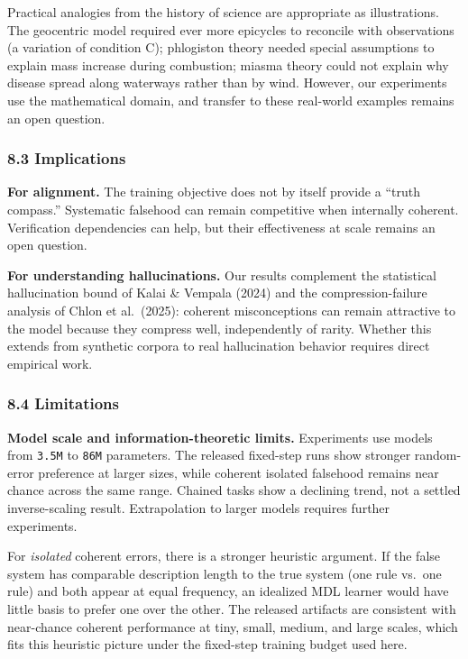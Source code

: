 \documentclass[
  11pt,
]{article}
\begin{document}
Practical analogies from the history of science are appropriate as
illustrations. The geocentric model required ever more epicycles to
reconcile with observations (a variation of condition C); phlogiston
theory needed special assumptions to explain mass increase during
combustion; miasma theory could not explain why disease spread along
waterways rather than by wind. However, our experiments use the
mathematical domain, and transfer to these real-world examples remains
an open question.

\subsubsection{8.3 Implications}\label{implications}

\textbf{For alignment.} The training objective does not by itself
provide a ``truth compass.'' Systematic falsehood can remain competitive
when internally coherent. Verification dependencies can help, but their
effectiveness at scale remains an open question.

\textbf{For understanding hallucinations.} Our results complement the
statistical hallucination bound of Kalai \& Vempala (2024) and the
compression-failure analysis of Chlon et al.~(2025): coherent
misconceptions can remain attractive to the model because they compress
well, independently of rarity. Whether this extends from synthetic
corpora to real hallucination behavior requires direct empirical work.

\subsubsection{8.4 Limitations}\label{limitations}

\textbf{Model scale and information-theoretic limits.} Experiments use
models from \texttt{3.5M} to \texttt{86M} parameters. The released
fixed-step runs show stronger random-error preference at larger sizes,
while coherent isolated falsehood remains near chance across the same
range. Chained tasks show a declining trend, not a settled
inverse-scaling result. Extrapolation to larger models requires further
experiments.

For \emph{isolated} coherent errors, there is a stronger heuristic
argument. If the false system has comparable description length to the
true system (one rule vs.~one rule) and both appear at equal frequency,
an idealized MDL learner would have little basis to prefer one over the
other. The released artifacts are consistent with near-chance coherent
performance at tiny, small, medium, and large scales, which fits this
heuristic picture under the fixed-step training budget used here.
\end{document}
